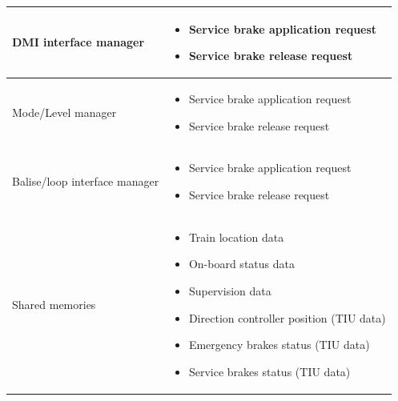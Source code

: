 \documentclass[nocc]{template/openetcs_report}
\begin{document}
\begin{longtable}{|l|l|}
				\hline	
				
					\begin{minipage}[t]{0.35\linewidth} DMI interface manager	\end{minipage} 
				&	\begin{minipage}[t]{0.65\linewidth}
						\begin{itemize}
							\item Service brake application request
							\item Service brake release request
						\end{itemize}			
					\end{minipage} \\
				
				\hline
					
					\begin{minipage}[t]{0.35\linewidth} Mode/Level manager 	\end{minipage} 
				&	\begin{minipage}[t]{0.65\linewidth}
						\begin{itemize}
							\item Service brake application request
							\item Service brake release request
						\end{itemize}			
					\end{minipage} \\
				
				\hline	
				
					\begin{minipage}[t]{0.35\linewidth} Balise/loop interface manager 	\end{minipage} 
				&	\begin{minipage}[t]{0.65\linewidth}
						\begin{itemize}
							\item Service brake application request
							\item Service brake release request
						\end{itemize}			
					\end{minipage} \\
				
				\hline
				
					\begin{minipage}[t]{0.35\linewidth} Shared memories	\end{minipage} 
				&	\begin{minipage}[t]{0.65\linewidth}
						\begin{itemize}
							\item Train location data
							\item On-board status data
							\item Supervision data
							\item Direction controller position (TIU data)
							\item Emergency brakes status (TIU data)
							\item Service brakes status (TIU data)
						\end{itemize}				
					\end{minipage} \\
				
				\hline	
			\end{longtable}	
\end{document}
